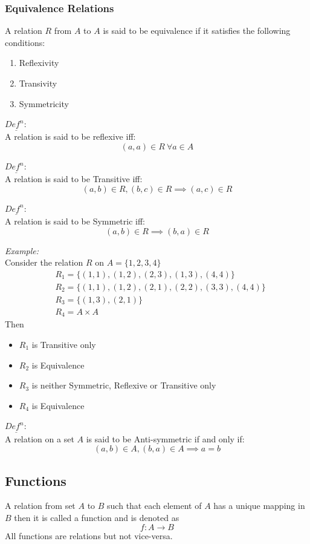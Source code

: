 \documentclass[11pt,letterpaper]{article}
\newenvironment{example}                             
        {\noindent\textit{Example:}\\}
	{}
\newenvironment{definition}
	{\begin{mdframed}$\underline{\textit{Def}^\textit{n}:} $\\}
	{\end{mdframed}}
\begin{document}
\subsubsection{Equivalence Relations}
A relation $R$ from $A$ to $A$ is said to be equivalence if it satisfies the following conditions:
\begin{enumerate}
  \item Reflexivity
  \item Transivity
  \item Symmetricity
\end{enumerate}

\begin{definition}
  A relation is said to be reflexive iff:
  \[
    (a,a) \in R \ \forall a \in A
  \]
\end{definition}
\begin{definition}
  A relation is said to be Transitive iff:
  \[
    (a,b) \in R, (b,c) \in R \implies (a,c) \in R
  \]
\end{definition}
\begin{definition}
  A relation is said to be Symmetric iff:
  \[
    (a,b) \in R  \implies (b,a) \in R
  \]
\end{definition}
\begin{example}
  Consider the relation $R$ on $A = \{1,2,3,4\}$\\
  \begin{align*}
    &R_1 = \{(1,1), (1,2), (2,3), (1,3), (4,4)\}\\
    &R_2 = \{(1,1), (1,2), (2,1), (2,2), (3,3), (4,4)\}\\
    &R_3 = \{(1,3), (2,1)\}\\
    &R_4 = A \times A
  \end{align*}
  Then 
  \begin{itemize}
    \item $R_1$ is Transitive only
    \item $R_2$ is Equivalence
    \item $R_3$ is neither Symmetric, Reflexive or Transitive only
    \item $R_4$ is Equivalence
  \end{itemize}
\end{example}
\begin{definition}
  A relation on a set $A$ is said to be Anti-symmetric if and only if:
  \[
    (a,b) \in A, (b,a) \in A \implies a = b
  \]
\end{definition}
\subsection{Functions}
A relation from set $A$ to $B$ such that each element of $A$ has a unique mapping in $B$ then it is called a function and is denoted as 
\[
  f: A \rightarrow B
\]
All functions are relations but not vice-versa. 
\end{document}
